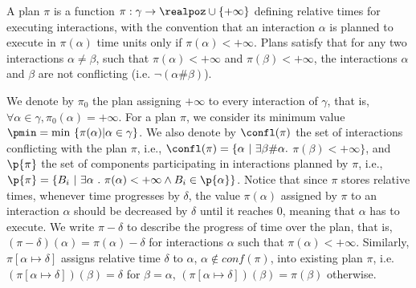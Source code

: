 \begin{definition}[Plan]\label{def:plan}
A plan $\pi$ is a function $\pi:\gamma \to\realpoz \cup \{ +\infty \}$ defining relative times
for executing interactions, with the convention that an interaction $\alpha$ is planned to 
execute in $\pi(\alpha)$ time units only if $\pi(\alpha) < +\infty$.
Plans satisfy that for any two interactions $\alpha \neq \beta$, such that $\pi(\alpha) < +\infty$
and $\pi(\beta) < +\infty$, the interactions $\alpha$ and $\beta$ are not conflicting 
(i.e. $\neg(\alpha\#\beta)$).
\end{definition}
We denote by $\pi_0$ the plan assigning $+\infty$ to every interaction of $\gamma$, that is,
$\forall\alpha\in\gamma,\pi_0(\alpha)=+\infty$. For a plan $\pi$, we consider its minimum value
$\pmin=\min\ \{\pi(\alpha)|\alpha\in\gamma\}$. 
We also denote by $\confl(\pi)$ the set of interactions conflicting with the plan $\pi$, i.e., 
$\confl(\pi) = \{ \alpha \ | \ \exists \beta \# \alpha.$ $ \pi (\beta) < +\infty \}$, 
and $\p{\pi}$ the set of components participating in interactions planned by 
$\pi$, i.e., $\p{\pi}=\{B_i\ |\ \exists\alpha\ . \ \pi(\alpha)<+\infty\wedge B_i\in\p{\alpha} \}$.
Notice that since $\pi$ stores relative times, whenever time progresses by $\delta$, the value 
$\pi(\alpha)$ assigned by $\pi$ to an interaction $\alpha$ should be decreased by $\delta$ 
until it reaches $0$, meaning that $\alpha$ has to execute.
We write $\pi-\delta$ to describe the progress of time 
over the plan, that is, $(\pi-\delta)(\alpha) = \pi(\alpha) - \delta$ for interactions $\alpha$ 
such that $\pi(\alpha) < +\infty$.
Similarly, $\pi [ \alpha \mapsto \delta ]$ assigns relative time $\delta$ to $\alpha$, 
$\alpha \notin conf(\pi)$, into existing plan $\pi$, i.e. $(\pi [ \alpha \mapsto \delta ])
(\beta) = \delta$ for $\beta = \alpha$, $(\pi [ \alpha \mapsto \delta ])(\beta) = \pi(\beta)$ 
otherwise.


